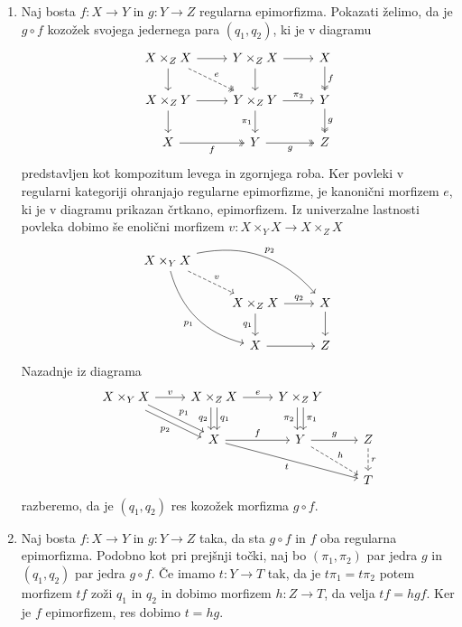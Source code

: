 \documentclass[../kategoricna_logika.tex]{subfiles}
\begin{document}
\begin{dokaz}
\begin{enumerate}[label=(\roman*)]
  \item %
    Naj bosta $f : X \to Y$ in $g : Y \to Z$ regularna epimorfizma.
    Pokazati želimo, da je $g \circ f$ kozožek svojega jedernega para $(q_1, q_2)$,
    ki je v diagramu
    \begin{equation*}
    \begin{tikzcd}[column sep=normal]
      X \times_Z X \ar[d] \ar[r] \ar[dr, dashed, two heads, "e"]  & Y \times_Z X \ar[d ] \ar[r] & X \ar[d, two heads, "f"] \\
      X \times_Z Y \ar[d] \ar[r] & Y \times_Z Y \ar[d, "\pi_1"'] \ar[r, "\pi_2"] & Y \ar[d, two heads, "g"] \\
      X \ar[r, two heads, "f"'] & Y \ar[r, two heads, "g"'] & Z
    \end{tikzcd}
    \end{equation*}
    predstavljen kot kompozitum levega in zgornjega roba.
    Ker povleki v regularni kategoriji ohranjajo regularne epimorfizme,
    je kanonični morfizem $e$, ki je v diagramu prikazan črtkano, epimorfizem.
    Iz univerzalne lastnosti povleka dobimo še enolični morfizem $v : X \times_Y X \to X \times_Z X$
    \begin{equation*}
    \begin{tikzcd}[column sep=normal, row sep=normal]
      X \times_Y X \ar[ddr, bend right, "p_1"'] \ar[drr, bend left, "p_2"] \ar[dr, dashed, "v"] & & \\
      & X \times_Z X \ar[d, "q_1"'] \ar[r, "q_2"] & X \ar[d] \\
      & X \ar[r] & Z
    \end{tikzcd}
    \end{equation*}
    Nazadnje iz diagrama
    \begin{equation*}
    \begin{tikzcd}
      X \times_Y X \ar[dr, shift left, "p_1"] \ar[dr, shift right, "p_2"'] \ar[r, "v"] & X \times_Z X \ar[d, shift left, "q_1"] \ar[d, shift right, "q_2"'] \ar[r, "e"] & Y \times_Z Y \ar[d, shift left, "\pi_1"] \ar[d, shift right, "\pi_2"'] &  \\
      & X \ar[r, "f"] \ar[drr, "t"'] & Y \ar[r, "g"] \ar[dr, dashed, "h"] & Z \ar[d, dashed, "r"] \\
      & & & T
    \end{tikzcd}
    \end{equation*}
    razberemo, da je $(q_1, q_2)$ res kozožek morfizma $g \circ f$.

    \item  %
      Naj bosta $f : X \to Y$ in $g : Y \to Z$ taka, da sta $g \circ f$ in $f$ oba regularna epimorfizma.
      Podobno kot pri prejšnji točki, naj bo $(\pi_1, \pi_2)$ par jedra $g$ in $(q_1, q_2)$ par jedra $g \circ f$.
      Če imamo $t : Y \to T$ tak, da je $t \pi_1 = t \pi_2$ potem morfizem $tf$ zoži $q_1$ in $q_2$ in dobimo morfizem
      $h : Z \to T$, da velja $t f = h g f$. Ker je $f$ epimorfizem, res dobimo $t = h g$.
\end{enumerate}
\end{dokaz}
\end{document}
